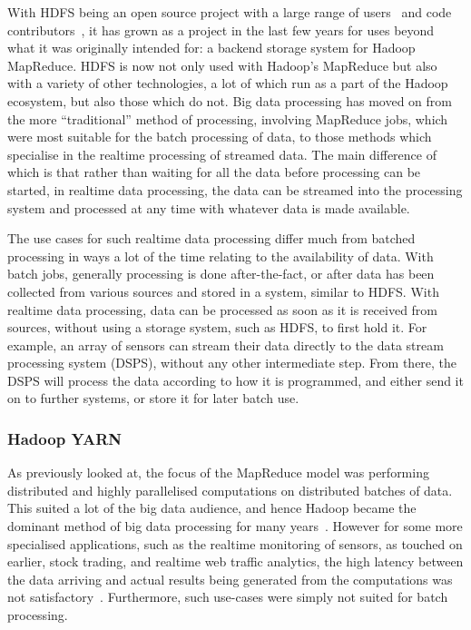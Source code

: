 With HDFS being an open source project with a large range of users~\cite{hadoop_users} and code
contributors~\cite{hadoop_committers}, it has grown as a project in the last few years for uses beyond what it was
originally intended for: a backend storage system for Hadoop MapReduce. HDFS is now not only used with Hadoop's
MapReduce but also with a variety of other technologies, a lot of which run as a part of the Hadoop ecosystem, but
also those which do not.
Big data processing has moved on from the more ``traditional'' method of processing, involving MapReduce jobs, which
were most suitable for the batch processing of data, to those methods which specialise in the realtime processing of
streamed data.
The main difference of which is that rather than waiting for all the data before processing can be started, in realtime
data processing, the data can be streamed into the processing system and processed at any time with whatever data is
made available.

The use cases for such realtime data processing differ much from batched processing in ways a lot of the time relating
to the availability of data. With batch jobs, generally processing is done after-the-fact, or after data has been
collected from various sources and stored in a system, similar to HDFS. With realtime data processing, data can be
processed as soon as it is received from sources, without using a storage system, such as HDFS, to first hold it.
For example, an array of sensors can stream their data directly to the data stream processing system (DSPS), without
any other intermediate step. From there, the DSPS will process the data according to how it is programmed, and either
send it on to further systems, or store it for later batch use.


\subsubsection{Hadoop YARN} %
\label{ssub:apache_hadoop_yarn_}

As previously looked at, the focus of the MapReduce model was performing distributed and highly parallelised computations
on distributed batches of data. This suited a lot of the big data audience, and hence Hadoop became the dominant
method of big data processing for many years~\cite{liu_survey_2014}. However for some more specialised applications, such as
the realtime monitoring of sensors, as touched on earlier, stock trading, and realtime web traffic analytics, the high
latency between the data arriving and actual results being generated from the computations was not
satisfactory~\cite{kamburugamuve_survey_2014}. Furthermore, such use-cases were simply not suited for batch processing.

